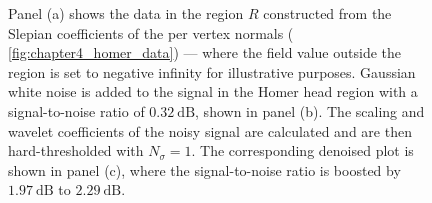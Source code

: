 \begin{figure}[htp]
	\centering
	\hfill
	\hfill
	\caption{
		Panel (a) shows the data in the region \(R\) constructed from the Slepian coefficients of the per vertex normals (\cf{} \cref{fig:chapter4_homer_data}) --- where the field value outside the region is set to negative infinity for illustrative purposes.
		Gaussian white noise is added to the signal in the Homer head region with a signal-to-noise ratio of \(\SI{0.32}{\dB}\), shown in panel (b).
		The scaling and wavelet coefficients of the noisy signal are calculated and are then hard-thresholded with \(N_{\sigma}=1\).
		The corresponding denoised plot is shown in panel (c), where the signal-to-noise ratio is boosted by \(\SI{1.97}{\dB}\) to \(\SI{2.29}{\dB}\).
	}\label{fig:chapter4_denoising}
\end{figure}
